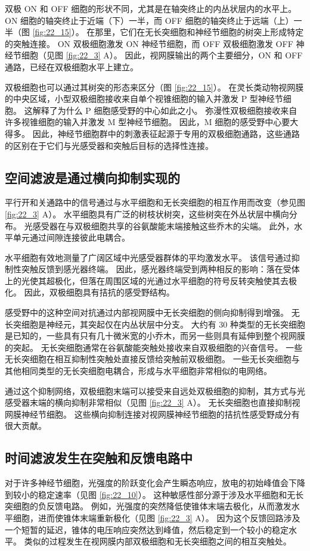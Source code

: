 双极 ON 和 OFF 细胞的形状不同，尤其是在轴突终止的内丛状层内的水平上。 
ON 细胞的轴突终止于近端（下）一半，而 OFF 细胞的轴突终止于远端（上）一半（图 \ref{fig:22_15}）。 
在那里，它们在无长突细胞和神经节细胞的树突上形成特定的突触连接。 
ON 双极细胞激发 ON 神经节细胞，而 OFF 双极细胞激发 OFF 神经节细胞（见图 \ref{fig:22_3} A）。 
因此，视网膜输出的两个主要细分，ON 和 OFF 通路，已经在双极细胞水平上建立。


双极细胞也可以通过其树突的形态来区分（图 \ref{fig:22_15}）。 
在灵长类动物视网膜的中央区域，小型双极细胞接收来自单个视锥细胞的输入并激发 P 型神经节细胞。 
这解释了为什么 P 细胞感受野的中心如此之小。 弥漫性双极细胞接收来自许多视锥细胞的输入并激发 M 型神经节细胞。 
因此，M 细胞的感受野中心要大得多。 
因此，神经节细胞群中的刺激表征起源于专用的双极细胞通路，这些通路的区别在于它们与光感受器和突触后目标的选择性连接。


\subsection{空间滤波是通过横向抑制实现的}
平行开和关通路中的信号通过与水平细胞和无长突细胞的相互作用而改变（参见图 \ref{fig:22_3} A）。 
水平细胞具有广泛的树枝状树突，这些树突在外丛状层中横向分布。 
光感受器在与双极细胞共享的谷氨酸能末端接触这些乔木的尖端。 
此外，水平单元通过间隙连接彼此电耦合。


水平细胞有效地测量了广阔区域中光感受器群体的平均激发水平。 
该信号通过抑制性突触反馈到感光器终端。 
因此，感光器终端受到两种相反的影响：落在受体上的光使其超极化，但落在周围区域的光通过水平细胞的符号反转突触使其去极化。 
因此，双极细胞具有拮抗的感受野结构。


感受野中的这种空间对抗通过内部视网膜中无长突细胞的侧向抑制得到增强。 
无长突细胞是神经元，其突起仅在内丛状层中分支。 
大约有 30 种类型的无长突细胞是已知的，一些具有只有几十微米宽的小乔木，而另一些则具有延伸到整个视网膜的突起。 
无长突细胞通常在谷氨酸能突触处接收来自双极细胞的兴奋信号。
一些无长突细胞在相互抑制性突触处直接反馈给突触前双极细胞。 
一些无长突细胞与其他相同类型的无长突细胞电耦合，形成与水平细胞非常相似的电网络。


通过这个抑制网络，双极细胞末端可以接受来自远处双极细胞的抑制，其方式与光感受器末端的横向抑制非常相似（见图 \ref{fig:22_3} A）。 
无长突细胞也直接抑制视网膜神经节细胞。 
这些横向抑制连接对视网膜神经节细胞的拮抗性感受野成分有很大贡献。


\subsection{时间滤波发生在突触和反馈电路中}
对于许多神经节细胞，光强度的阶跃变化会产生瞬态响应，放电的初始峰值会下降到较小的稳定速率（见图 \ref{fig:22_10}）。 
这种敏感性部分源于涉及水平细胞和无长突细胞的负反馈电路。 
例如，光强度的突然降低使锥体末端去极化，从而激发水平细胞，进而使锥体末端重新极化（见图 \ref{fig:22_3} A）。 
因为这个反馈回路涉及一个短暂的延迟，锥体的电压响应突然达到峰值，然后稳定到一个较小的稳定水平。 
类似的过程发生在视网膜内部双极细胞和无长突细胞之间的相互突触处。


